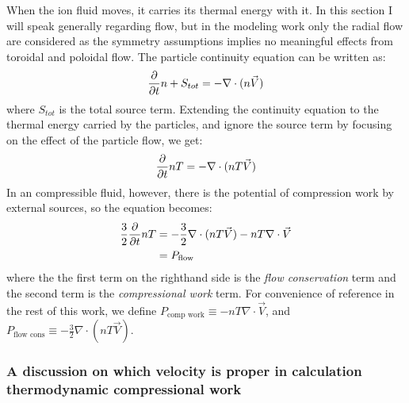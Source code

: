 \begin{refsection}
When the ion fluid moves, it carries its thermal energy with it. 
In this section I will speak generally regarding flow, but in the modeling work only the radial flow are considered as the symmetry assumptions implies no meaningful effects from toroidal and poloidal flow. The particle continuity equation can be written as:
\begin{align}
    \frac{\partial}{\partial t} n + S_{tot} = -\nabla\cdot(n\vec{V})
\end{align}
where $S_{tot}$ is the total source term. Extending the continuity equation to the thermal energy carried by the particles, and ignore the source term by focusing on the effect of the particle flow, we get:
\begin{align}\label{eqn:thermal_continuity}
    \frac{\partial}{\partial t} nT = -\nabla\cdot(nT\vec{V})
\end{align}
In an compressible fluid, however, there is the potential of compression work by external sources, so the equation becomes:
\begin{align}
    \frac{3}{2}\frac{\partial}{\partial t} nT &= -\frac{3}{2}\nabla\cdot(nT\vec{V}) - nT\nabla\cdot\vec{V}\\
    &= P_{\text{flow}}\nonumber
\end{align}
where the the first term on the righthand side is the \emph{flow conservation} term and the second term is the \emph{compressional work} term. For convenience of reference in the rest of this work, we define $P_{\text{comp work}} \equiv - nT\nabla\cdot\vec{V} $, and $P_{\text{flow cons}} \equiv -\frac{3}{2}\nabla\cdot(nT\vec{V})$.


\subsubsection{A discussion on which velocity is proper in calculation thermodynamic compressional work}


\end{refsection}
